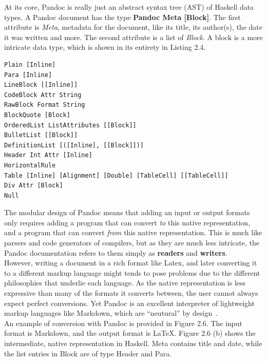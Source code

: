 At its core, Pandoc is really just an abstract syntax tree (AST) of Haskell data types. A Pandoc document has the type \textbf{Pandoc Meta [Block]}. The first attribute is \textit{Meta}, metadata for the document, like its title, its author(s), the date it was written and more. The second attribute is a list of \textit{Block}. A block is a more intricate data type, which is shown in its entirety in Listing 2.4.

\begin{lstlisting}[caption={The ``Block'' data type of Pandocs native representation}, captionpos=b]
Plain [Inline]
Para [Inline]
LineBlock [[Inline]]
CodeBlock Attr String
RawBlock Format String
BlockQuote [Block]
OrderedList ListAttributes [[Block]]
BulletList [[Block]]
DefinitionList [([Inline], [[Block]])]
Header Int Attr [Inline]
HorizontalRule
Table [Inline] [Alignment] [Double] [TableCell] [[TableCell]]
Div Attr [Block]
Null
\end{lstlisting}

The modular design of Pandoc means that adding an input or output formats only requires adding a program that can convert \textit{to} this native representation, and a program that can convert \textit{from} this native representation. This is much like parsers and code generators of compilers, but as they are much less intricate, the Pandoc documentation refers to them simply as \textbf{readers} and \textbf{writers}. \hfill \\

However, writing a document in a rich format like Latex, and later converting it to a different markup language might tends to pose problems due to the different philosophies that underlie each language. As the native representation is less expressive than many of the formats it converts between, the user cannot always expect perfect conversions. Yet Pandoc is an excellent interpreter of lightweight markup languages like Markdown, which are ``neutural'' by design~\cite{dominici2014}. \hfill \\

An example of conversion with Pandoc is provided in Figure 2.6. The input format is Markdown, and the output format is LaTeX. Figure 2.6 (b) shows the intermediate, native representation in Haskell. Meta contains title and date, while the list entries in Block are of type Header and Para. \hfill \\

